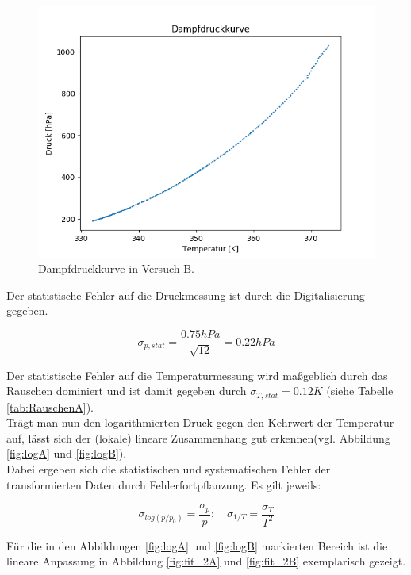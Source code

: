 \documentclass[12pt,a4paper]{article}
\begin{document}
\begin{figure}[H]
\begin{center}
\includegraphics[scale=0.8]{Bilder/DampfdruckkurveB}
\caption[Dampfdruckkurve B]{Dampfdruckkurve in Versuch B.}
\label{fig:DampfB}
\end{center}
\end{figure}


Der statistische Fehler auf die Druckmessung ist durch die Digitalisierung gegeben.

\begin{equation}
\sigma_{p, stat}=\frac{0.75 hPa}{\sqrt{12}}=0.22 hPa
\end{equation}


Der statistische Fehler auf die Temperaturmessung wird maßgeblich durch das Rauschen dominiert und ist damit gegeben durch $\sigma_{T, stat}=0.12K$ (siehe Tabelle \ref{tab:RauschenA}).\\

Trägt man nun den logarithmierten Druck gegen den Kehrwert der Temperatur auf, lässt sich der (lokale) lineare Zusammenhang gut erkennen(vgl. Abbildung \ref{fig:logA} und \ref{fig:logB}).\\

Dabei ergeben sich die statistischen und systematischen Fehler der transformierten Daten durch Fehlerfortpflanzung. Es gilt jeweils:

\begin{equation}
\sigma_{log(p/p_0)}=\frac{\sigma_p}{p} ; \quad \sigma_{1/T}=\frac{\sigma_T}{T^2}
\end{equation}

Für die in den Abbildungen \ref{fig:logA} und \ref{fig:logB} markierten Bereich ist die lineare Anpassung in Abbildung \ref{fig:fit_2A} und \ref{fig:fit_2B} exemplarisch gezeigt.\\
\end{document}
